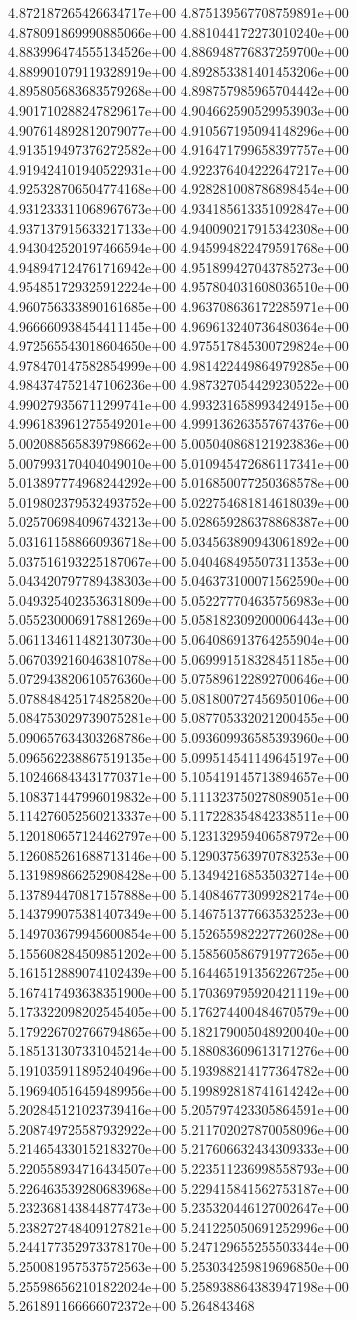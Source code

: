 4.872187265426634717e+00	4.875139567708759891e+00	4.878091869990885066e+00	4.881044172273010240e+00	4.883996474555134526e+00	4.886948776837259700e+00	4.889901079119328919e+00	4.892853381401453206e+00	4.895805683683579268e+00	4.898757985965704442e+00	4.901710288247829617e+00	4.904662590529953903e+00	4.907614892812079077e+00	4.910567195094148296e+00	4.913519497376272582e+00	4.916471799658397757e+00	4.919424101940522931e+00	4.922376404222647217e+00	4.925328706504774168e+00	4.928281008786898454e+00	4.931233311068967673e+00	4.934185613351092847e+00	4.937137915633217133e+00	4.940090217915342308e+00	4.943042520197466594e+00	4.945994822479591768e+00	4.948947124761716942e+00	4.951899427043785273e+00	4.954851729325912224e+00	4.957804031608036510e+00	4.960756333890161685e+00	4.963708636172285971e+00	4.966660938454411145e+00	4.969613240736480364e+00	4.972565543018604650e+00	4.975517845300729824e+00	4.978470147582854999e+00	4.981422449864979285e+00	4.984374752147106236e+00	4.987327054429230522e+00	4.990279356711299741e+00	4.993231658993424915e+00	4.996183961275549201e+00	4.999136263557674376e+00	5.002088565839798662e+00	5.005040868121923836e+00	5.007993170404049010e+00	5.010945472686117341e+00	5.013897774968244292e+00	5.016850077250368578e+00	5.019802379532493752e+00	5.022754681814618039e+00	5.025706984096743213e+00	5.028659286378868387e+00	5.031611588660936718e+00	5.034563890943061892e+00	5.037516193225187067e+00	5.040468495507311353e+00	5.043420797789438303e+00	5.046373100071562590e+00	5.049325402353631809e+00	5.052277704635756983e+00	5.055230006917881269e+00	5.058182309200006443e+00	5.061134611482130730e+00	5.064086913764255904e+00	5.067039216046381078e+00	5.069991518328451185e+00	5.072943820610576360e+00	5.075896122892700646e+00	5.078848425174825820e+00	5.081800727456950106e+00	5.084753029739075281e+00	5.087705332021200455e+00	5.090657634303268786e+00	5.093609936585393960e+00	5.096562238867519135e+00	5.099514541149645197e+00	5.102466843431770371e+00	5.105419145713894657e+00	5.108371447996019832e+00	5.111323750278089051e+00	5.114276052560213337e+00	5.117228354842338511e+00	5.120180657124462797e+00	5.123132959406587972e+00	5.126085261688713146e+00	5.129037563970783253e+00	5.131989866252908428e+00	5.134942168535032714e+00	5.137894470817157888e+00	5.140846773099282174e+00	5.143799075381407349e+00	5.146751377663532523e+00	5.149703679945600854e+00	5.152655982227726028e+00	5.155608284509851202e+00	5.158560586791977265e+00	5.161512889074102439e+00	5.164465191356226725e+00	5.167417493638351900e+00	5.170369795920421119e+00	5.173322098202545405e+00	5.176274400484670579e+00	5.179226702766794865e+00	5.182179005048920040e+00	5.185131307331045214e+00	5.188083609613171276e+00	5.191035911895240496e+00	5.193988214177364782e+00	5.196940516459489956e+00	5.199892818741614242e+00	5.202845121023739416e+00	5.205797423305864591e+00	5.208749725587932922e+00	5.211702027870058096e+00	5.214654330152183270e+00	5.217606632434309333e+00	5.220558934716434507e+00	5.223511236998558793e+00	5.226463539280683968e+00	5.229415841562753187e+00	5.232368143844877473e+00	5.235320446127002647e+00	5.238272748409127821e+00	5.241225050691252996e+00	5.244177352973378170e+00	5.247129655255503344e+00	5.250081957537572563e+00	5.253034259819696850e+00	5.255986562101822024e+00	5.258938864383947198e+00	5.261891166666072372e+00	5.264843468